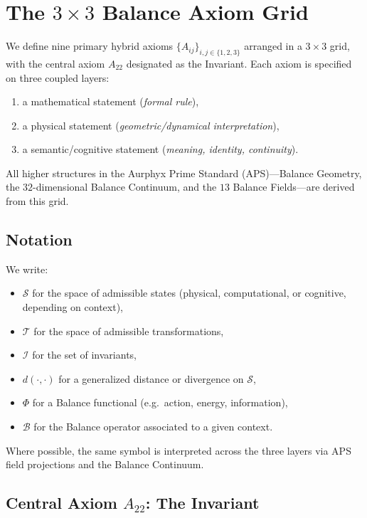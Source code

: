 \section{The $3 \times 3$ Balance Axiom Grid}

We define nine primary hybrid axioms $\{A_{ij}\}_{i,j \in \{1,2,3\}}$ arranged in a $3 \times 3$ grid, with the central axiom $A_{22}$ designated as the Invariant. Each axiom is specified on three coupled layers:
\begin{enumerate}
  \item a mathematical statement (\emph{formal rule}),
  \item a physical statement (\emph{geometric/dynamical interpretation}),
  \item a semantic/cognitive statement (\emph{meaning, identity, continuity}).
\end{enumerate}
All higher structures in the Aurphyx Prime Standard (APS)---Balance Geometry, the $32$-dimensional Balance Continuum, and the $13$ Balance Fields---are derived from this grid.\cite{AurphyxThesis,AurphyxSymbiotic,AurphyxFractalQC}

\subsection{Notation}

We write:
\begin{itemize}
  \item $\mathcal{S}$ for the space of admissible states (physical, computational, or cognitive, depending on context),
  \item $\mathcal{T}$ for the space of admissible transformations,
  \item $\mathcal{I}$ for the set of invariants,
  \item $d(\cdot,\cdot)$ for a generalized distance or divergence on $\mathcal{S}$,
  \item $\Phi$ for a Balance functional (e.g.\ action, energy, information),
  \item $\mathcal{B}$ for the Balance operator associated to a given context.
\end{itemize}
Where possible, the same symbol is interpreted across the three layers via APS field projections and the Balance Continuum.\cite{AurphyxThesis,AurphyxSymbiotic}

\subsection{Central Axiom $A_{22}$: The Invariant}

